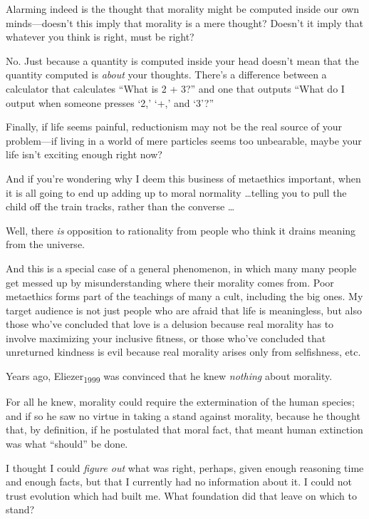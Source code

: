 {
 Alarming indeed is the thought that morality might be computed
inside our own minds---doesn't this imply that morality
is a mere thought? Doesn't it imply that whatever you
think is right, must be right?}

{
 No. Just because a quantity is computed inside your head
doesn't mean that the quantity computed is
\textit{about} your thoughts. There's a difference
between a calculator that calculates ``What is 2 +
3?'' and one that outputs ``What do
I output when someone presses `2,'
`+,' and
`3'?''}

{
 Finally, if life seems painful, reductionism may not be the real
source of your problem---if living in a world of mere particles seems
too unbearable, maybe your life isn't exciting enough
right now?}

{
 And if you're wondering why I deem this business
of metaethics important, when it is all going to end up adding up to
moral normality \ldots telling you to pull the child off the train
tracks, rather than the converse \ldots}

{
 Well, there \textit{is} opposition to rationality from people who
think it drains meaning from the universe.}

{
 And this is a special case of a general phenomenon, in which many
many people get messed up by misunderstanding where their morality
comes from. Poor metaethics forms part of the teachings of many a cult,
including the big ones. My target audience is not just people who are
afraid that life is meaningless, but also those who've
concluded that love is a delusion because real morality has to involve
maximizing your inclusive fitness, or those who've
concluded that unreturned kindness is evil because real morality arises
only from selfishness, etc.}

\myendsectiontext


{
 Years ago, Eliezer\textsubscript{1999} was convinced that he knew
\textit{nothing} about morality. }

{
 For all he knew, morality could require the extermination of the
human species; and if so he saw no virtue in taking a stand against
morality, because he thought that, by definition, if he postulated that
moral fact, that meant human extinction was what
``should'' be done.}

{
 I thought I could \textit{figure out} what was right, perhaps,
given enough reasoning time and enough facts, but that I currently had
no information about it. I could not trust evolution which had built
me. What foundation did that leave on which to stand?}

